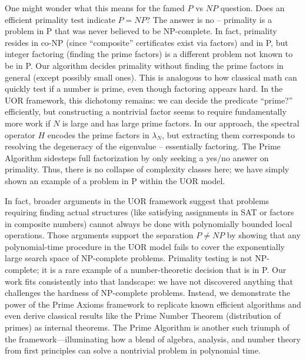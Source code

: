 \documentclass[11pt]{article}
\begin{document}
{One might wonder what this means for the famed $P$ vs $NP$ question. Does an efficient primality test indicate $P = NP$? The answer is no – primality is a problem in P that was never believed to be NP-complete. In fact, primality resides in co-NP (since “composite” certificates exist via factors) and in P, but integer factoring (finding the prime factors) is a different problem not known to be in P. Our algorithm decides primality without finding the prime factors in general (except possibly small ones). This is analogous to how classical math can quickly test if a number is prime, even though factoring appears hard. In the UOR framework, this dichotomy remains: we can decide the predicate “prime?” efficiently, but constructing a nontrivial factor seems to require fundamentally more work if $N$ is large and has large prime factors. In our approach, the spectral operator $H$ encodes the prime factors in $\lambda_N$, but extracting them corresponds to resolving the degeneracy of the eigenvalue – essentially factoring. The Prime Algorithm sidesteps full factorization by only seeking a yes/no answer on primality. Thus, there is no collapse of complexity classes here; we have simply shown an example of a problem in P within the UOR model.

In fact, broader arguments in the UOR framework suggest that problems requiring finding actual structures (like satisfying assignments in SAT or factors in composite numbers) cannot always be done with polynomially bounded local operations. Those arguments support the separation $P \neq NP$ by showing that any polynomial-time procedure in the UOR model fails to cover the exponentially large search space of NP-complete problems. Primality testing is not NP-complete; it is a rare example of a number-theoretic decision that is in P. Our work fits consistently into that landscape: we have not discovered anything that challenges the hardness of NP-complete problems. Instead, we demonstrate the power of the Prime Axioms framework to replicate known efficient algorithms and even derive classical results like the Prime Number Theorem (distribution of primes) as internal theorems. The Prime Algorithm is another such triumph of the framework—illuminating how a blend of algebra, analysis, and number theory from first principles can solve a nontrivial problem in polynomial time.

}
\end{document}
